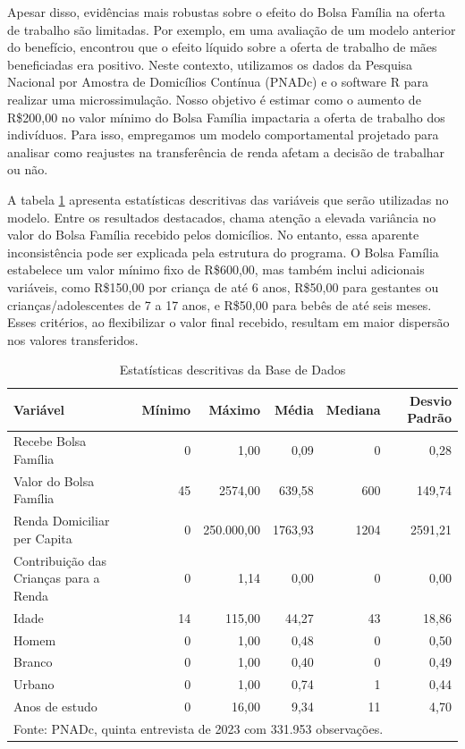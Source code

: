 \documentclass[12pt]{article}
\theoremstyle{break}
\begin{document}
Apesar disso, evidências mais robustas sobre o efeito do Bolsa Família na oferta de trabalho são limitadas. Por exemplo, em uma avaliação de um modelo anterior do benefício, \textcite{tavares2010efeito} encontrou que o efeito líquido sobre a oferta de trabalho de mães beneficiadas era positivo. Neste contexto, utilizamos os dados da Pesquisa Nacional por Amostra de Domicílios Contínua (PNADc) e o software R para realizar uma microssimulação. Nosso objetivo é estimar como o aumento de R\$200,00 no valor mínimo do Bolsa Família impactaria a oferta de trabalho dos indivíduos. Para isso, empregamos um modelo comportamental projetado para analisar como reajustes na transferência de renda afetam a decisão de trabalhar ou não.

A tabela \ref{tab:descritivas-bf} apresenta estatísticas descritivas das variáveis que serão utilizadas no modelo. Entre os resultados destacados, chama atenção a elevada variância no valor do Bolsa Família recebido pelos domicílios. No entanto, essa aparente inconsistência pode ser explicada pela estrutura do programa. O Bolsa Família estabelece um valor mínimo fixo de R\$600,00, mas também inclui adicionais variáveis, como R\$150,00 por criança de até 6 anos, R\$50,00 para gestantes ou crianças/adolescentes de 7 a 17 anos, e R\$50,00 para bebês de até seis meses. Esses critérios, ao flexibilizar o valor final recebido, resultam em maior dispersão nos valores transferidos.

\begin{table}[H]
\centering
\caption{Estatísticas descritivas da Base de Dados}
\centering
\begin{tabular}[t]{lrrrrr}
\toprule
Variável & Mínimo & Máximo & Média & Mediana & Desvio Padrão\\
\midrule
Recebe Bolsa Família & 0 & 1,00 & 0,09 & 0 & 0,28\\
Valor do Bolsa Família & 45 & 2574,00 & 639,58 & 600 & 149,74\\
Renda Domiciliar per Capita & 0 & 250.000,00 & 1763,93 & 1204 & 2591,21\\
Contribuição das Crianças para a Renda & 0 & 1,14 & 0,00 & 0 & 0,00\\
Idade & 14 & 115,00 & 44,27 & 43 & 18,86\\
\addlinespace
Homem & 0 & 1,00 & 0,48 & 0 & 0,50\\
Branco & 0 & 1,00 & 0,40 & 0 & 0,49\\
Urbano & 0 & 1,00 & 0,74 & 1 & 0,44\\
Anos de estudo & 0 & 16,00 & 9,34 & 11 & 4,70\\
\bottomrule
\multicolumn{6}{l}{\footnotesize Fonte: PNADc, quinta entrevista de 2023 com 331.953 observações.}
\end{tabular}
\label{tab:descritivas-bf}
\end{table}
\end{document}
